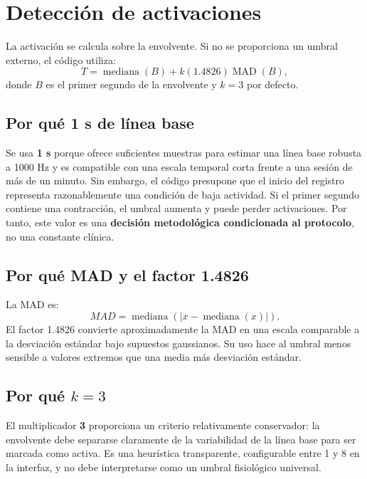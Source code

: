 \documentclass[11pt,spanish]{article}
\begin{document}
\section{Detección de activaciones}

La activación se calcula sobre la envolvente. Si no se proporciona un umbral externo, el código utiliza:
\begin{equation}
T=\operatorname{mediana}(B)+k(1.4826)\operatorname{MAD}(B),
\end{equation}
donde $B$ es el primer segundo de la envolvente y $k=3$ por defecto.

\subsection{Por qué 1 s de línea base}

Se usa \textbf{1 s} porque ofrece suficientes muestras para estimar una línea base robusta a 1000 Hz y es compatible con una escala temporal corta frente a una sesión de más de un minuto. Sin embargo, el código presupone que el inicio del registro representa razonablemente una condición de baja actividad. Si el primer segundo contiene una contracción, el umbral aumenta y puede perder activaciones. Por tanto, este valor es una \textbf{decisión metodológica condicionada al protocolo}, no una constante clínica.

\subsection{Por qué MAD y el factor 1.4826}

La MAD es:
\begin{equation}
MAD=\operatorname{mediana}(|x-\operatorname{mediana}(x)|).
\end{equation}
El factor 1.4826 convierte aproximadamente la MAD en una escala comparable a la desviación estándar bajo supuestos gaussianos. Su uso hace al umbral menos sensible a valores extremos que una media más desviación estándar.

\subsection{Por qué $k=3$}

El multiplicador \textbf{3} proporciona un criterio relativamente conservador: la envolvente debe separarse claramente de la variabilidad de la línea base para ser marcada como activa. Es una heurística transparente, configurable entre 1 y 8 en la interfaz, y no debe interpretarse como un umbral fisiológico universal.
\end{document}
